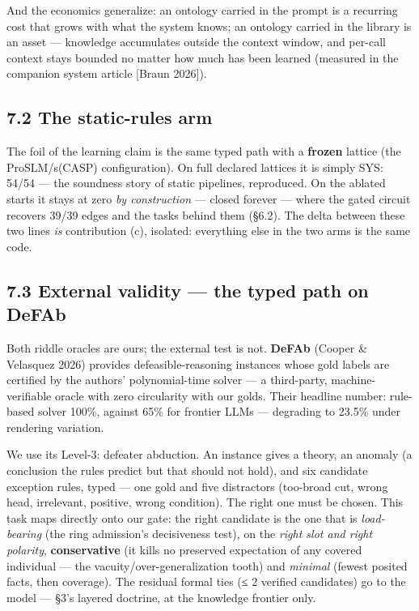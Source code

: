 \documentclass[11pt]{article}
\begin{document}
And the economics generalize: an ontology carried in the prompt is a recurring cost that grows with what the system knows; an ontology carried in the library is an asset — knowledge accumulates outside the context window, and per-call context stays bounded no matter how much has been learned (measured in the companion system article [Braun 2026]).

\subsection*{7.2 The static-rules arm}

The foil of the learning claim is the same typed path with a \textbf{frozen} lattice (the ProSLM/s(CASP) configuration). On full declared lattices it is simply SYS: 54/54 — the soundness story of static pipelines, reproduced. On the ablated starts it stays at zero \emph{by construction} — closed forever — where the gated circuit recovers 39/39 edges and the tasks behind them (§6.2). The delta between these two lines \emph{is} contribution (c), isolated: everything else in the two arms is the same code.

\subsection*{7.3 External validity — the typed path on DeFAb}

Both riddle oracles are ours; the external test is not. \textbf{DeFAb} (Cooper \& Velasquez 2026) provides defeasible-reasoning instances whose gold labels are certified by the authors' polynomial-time solver — a third-party, machine-verifiable oracle with zero circularity with our golds. Their headline number: rule-based solver 100\%, against 65\% for frontier LLMs — degrading to 23.5\% under rendering variation.

We use its Level-3: defeater abduction. An instance gives a theory, an anomaly (a conclusion the rules predict but that should not hold), and six candidate exception rules, typed — one gold and five distractors (too-broad cut, wrong head, irrelevant, positive, wrong condition). The right one must be chosen. This task maps directly onto our gate: the right candidate is the one that is \emph{load-bearing} (the ring admission's decisiveness test), on the \emph{right slot and right polarity}, \textbf{conservative} (it kills no preserved expectation of any covered individual — the vacuity/over-generalization tooth) and \emph{minimal} (fewest posited facts, then coverage). The residual formal ties (≤ 2 verified candidates) go to the model — §3's layered doctrine, at the knowledge frontier only.
\end{document}
